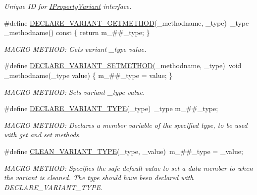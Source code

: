 \begin{DoxyCompactItemize}
\begin{DoxyCompactList}\small\item\em Unique I\-D for \hyperlink{class_i_property_variant}{I\-Property\-Variant} interface. \end{DoxyCompactList}\item 
\#define \hyperlink{group___property_classes_ga8621ccbce057779b93b54f2f06440126}{D\-E\-C\-L\-A\-R\-E\-\_\-\-V\-A\-R\-I\-A\-N\-T\-\_\-\-G\-E\-T\-M\-E\-T\-H\-O\-D}(\-\_\-methodname, \-\_\-type)~\-\_\-type \-\_\-methodname() const \{ return m\-\_\-\#\#\-\_\-type; \}
\begin{DoxyCompactList}\small\item\em M\-A\-C\-R\-O M\-E\-T\-H\-O\-D\-: Gets variant \-\_\-type value. \end{DoxyCompactList}\item 
\#define \hyperlink{group___property_classes_gab10c17d63104a3b2b6e8c26baeb1548b}{D\-E\-C\-L\-A\-R\-E\-\_\-\-V\-A\-R\-I\-A\-N\-T\-\_\-\-S\-E\-T\-M\-E\-T\-H\-O\-D}(\-\_\-methodname, \-\_\-type)~void \-\_\-methodname(\-\_\-type value) \{ m\-\_\-\#\#\-\_\-type = value; \}
\begin{DoxyCompactList}\small\item\em M\-A\-C\-R\-O M\-E\-T\-H\-O\-D\-: Sets variant \-\_\-type value. \end{DoxyCompactList}\item 
\#define \hyperlink{group___property_classes_ga6ceaa3b2a99aaa90a1ea66489d2bcc86}{D\-E\-C\-L\-A\-R\-E\-\_\-\-V\-A\-R\-I\-A\-N\-T\-\_\-\-T\-Y\-P\-E}(\-\_\-type)~\-\_\-type m\-\_\-\#\#\-\_\-type;
\begin{DoxyCompactList}\small\item\em M\-A\-C\-R\-O M\-E\-T\-H\-O\-D\-: Declares a member variable of the specified type, to be used with get and set methods. \end{DoxyCompactList}\item 
\#define \hyperlink{group___property_classes_ga336b645c5f84965e75abdf9213c0957e}{C\-L\-E\-A\-N\-\_\-\-V\-A\-R\-I\-A\-N\-T\-\_\-\-T\-Y\-P\-E}(\-\_\-type, \-\_\-value)~m\-\_\-\#\#\-\_\-type = \-\_\-value;
\begin{DoxyCompactList}\small\item\em M\-A\-C\-R\-O M\-E\-T\-H\-O\-D\-: Specifies the safe default value to set a data member to when the variant is cleaned. The type should have been declared with D\-E\-C\-L\-A\-R\-E\-\_\-\-V\-A\-R\-I\-A\-N\-T\-\_\-\-T\-Y\-P\-E. \end{DoxyCompactList}\item 

\end{DoxyCompactItemize}
